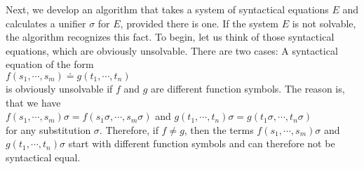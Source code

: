 Next, we develop an algorithm that takes a system of syntactical  equations $E$ and
calculates a unifier  $\sigma$ for $E$, provided there is one.  If the system $E$ is not
solvable, the algorithm recognizes this fact.  To begin, let us think of those syntactical
equations, which are obviously unsolvable.  There are two cases:  A syntactical equation of the form  \\[0.2cm]
\hspace*{1.3cm} $f(s_1,\cdots,s_m) \doteq g(t_1,\cdots, t_n)$ \\[0.2cm]
is obviously unsolvable if  $f$ and $g$ are different function symbols.  The reason is,
that we have \\[0.2cm]
\hspace*{1.0cm}
$f(s_1,\cdots,s_m)\sigma = f(s_1\sigma,\cdots,s_m\sigma)$ \quad and \quad
$g(t_1,\cdots, t_n)\sigma = g(t_1\sigma,\cdots,t_n\sigma)$ 
\\[0.2cm]
for any substitution $\sigma$.  Therefore, if $f \not = g$, then the terms
$f(s_1,\cdots,s_m)\sigma$ and $g(t_1,\cdots, t_n)\sigma$ start with different function
symbols and can therefore not be syntactical equal.


